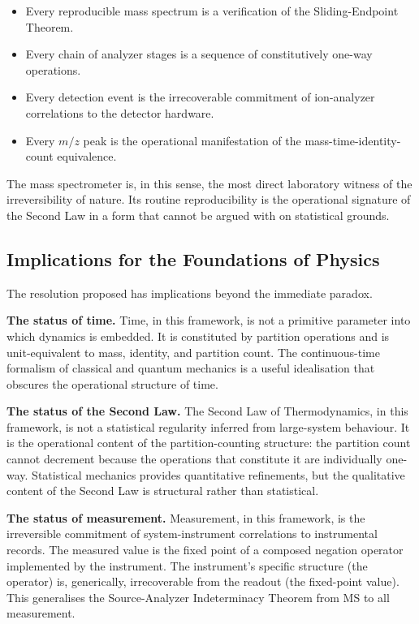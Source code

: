 \documentclass[twocolumn,10pt,a4paper]{article}
\theoremstyle{definition}
\theoremstyle{remark}
\begin{document}
\begin{itemize}[leftmargin=1.2em,itemsep=0.2em]
    \item Every reproducible mass spectrum is a verification of the Sliding-Endpoint Theorem.
    \item Every chain of analyzer stages is a sequence of constitutively one-way operations.
    \item Every detection event is the irrecoverable commitment of ion-analyzer correlations to the detector hardware.
    \item Every $m/z$ peak is the operational manifestation of the mass-time-identity-count equivalence.
\end{itemize}

The mass spectrometer is, in this sense, the most direct laboratory witness of the irreversibility of nature. Its routine reproducibility is the operational signature of the Second Law in a form that cannot be argued with on statistical grounds.

\subsection{Implications for the Foundations of Physics}

The resolution proposed has implications beyond the immediate paradox.

\textbf{The status of time.} Time, in this framework, is not a primitive parameter into which dynamics is embedded. It is constituted by partition operations and is unit-equivalent to mass, identity, and partition count. The continuous-time formalism of classical and quantum mechanics is a useful idealisation that obscures the operational structure of time.

\textbf{The status of the Second Law.} The Second Law of Thermodynamics, in this framework, is not a statistical regularity inferred from large-system behaviour. It is the operational content of the partition-counting structure: the partition count cannot decrement because the operations that constitute it are individually one-way. Statistical mechanics provides quantitative refinements, but the qualitative content of the Second Law is structural rather than statistical.

\textbf{The status of measurement.} Measurement, in this framework, is the irreversible commitment of system-instrument correlations to instrumental records. The measured value is the fixed point of a composed negation operator implemented by the instrument. The instrument's specific structure (the operator) is, generically, irrecoverable from the readout (the fixed-point value). This generalises the Source-Analyzer Indeterminacy Theorem from MS to all measurement.
\end{document}
